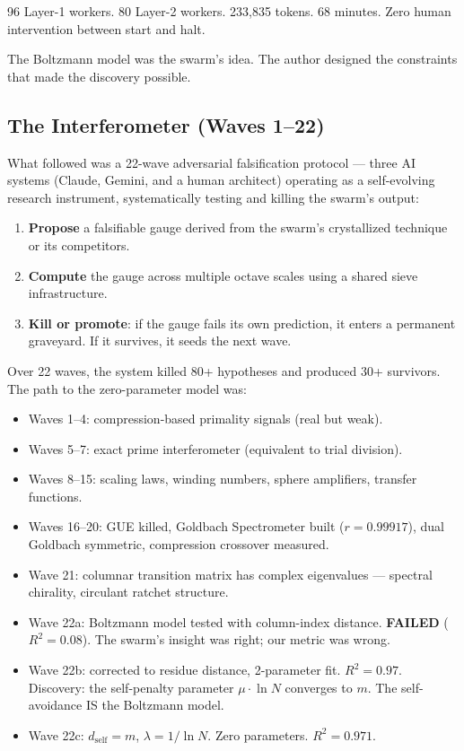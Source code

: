 \documentclass[
  11pt,
]{article}
\providecommand{\tightlist}{%
  \setlength{\itemsep}{0pt}\setlength{\parskip}{0pt}}
\begin{document}
96 Layer-1 workers. 80 Layer-2 workers. 233,835 tokens. 68 minutes. Zero
human intervention between start and halt.

The Boltzmann model was the swarm's idea. The author designed the
constraints that made the discovery possible.

\subsection{The Interferometer (Waves 1--22)}\label{sec:interferometer}

What followed was a 22-wave adversarial falsification protocol --- three
AI systems (Claude, Gemini, and a human architect) operating as a
self-evolving research instrument, systematically testing and killing
the swarm's output:

\begin{enumerate}
\def\labelenumi{\arabic{enumi}.}
\tightlist
\item
  \textbf{Propose} a falsifiable gauge derived from the swarm's
  crystallized technique or its competitors.
\item
  \textbf{Compute} the gauge across multiple octave scales using a
  shared sieve infrastructure.
\item
  \textbf{Kill or promote}: if the gauge fails its own prediction, it
  enters a permanent graveyard. If it survives, it seeds the next wave.
\end{enumerate}

Over 22 waves, the system killed 80+ hypotheses and produced 30+
survivors. The path to the zero-parameter model was:

\begin{itemize}
\tightlist
\item
  Waves 1--4: compression-based primality signals (real but weak).
\item
  Waves 5--7: exact prime interferometer (equivalent to trial division).
\item
  Waves 8--15: scaling laws, winding numbers, sphere amplifiers,
  transfer functions.
\item
  Waves 16--20: GUE killed, Goldbach Spectrometer built
  (\(r = 0.99917\)), dual Goldbach symmetric, compression crossover
  measured.
\item
  Wave 21: columnar transition matrix has complex eigenvalues ---
  spectral chirality, circulant ratchet structure.
\item
  Wave 22a: Boltzmann model tested with column-index distance.
  \textbf{FAILED} (\(R^2 = 0.08\)). The swarm's insight was right; our
  metric was wrong.
\item
  Wave 22b: corrected to residue distance, 2-parameter fit.
  \(R^2 = 0.97\). Discovery: the self-penalty parameter
  \(\mu \cdot \ln N\) converges to \(m\). The self-avoidance IS the
  Boltzmann model.
\item
  Wave 22c: \(d_{\text{self}} = m\), \(\lambda = 1/\ln N\). Zero
  parameters. \(R^2 = 0.971\).
\end{itemize}
\end{document}
